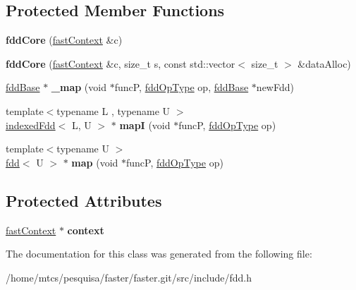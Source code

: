 \subsection*{Protected Member Functions}
\begin{DoxyCompactItemize}
\item 
\hypertarget{classfaster_1_1fddCore_af2bf966f3d75e2d7d0d81f120fb7599a}{}\label{classfaster_1_1fddCore_af2bf966f3d75e2d7d0d81f120fb7599a} 
{\bfseries fdd\+Core} (\hyperlink{classfaster_1_1fastContext}{fast\+Context} \&c)
\item 
\hypertarget{classfaster_1_1fddCore_a437156da84fb4f0e7cb58f2f67ff172b}{}\label{classfaster_1_1fddCore_a437156da84fb4f0e7cb58f2f67ff172b} 
{\bfseries fdd\+Core} (\hyperlink{classfaster_1_1fastContext}{fast\+Context} \&c, size\+\_\+t s, const std\+::vector$<$ size\+\_\+t $>$ \&data\+Alloc)
\item 
\hypertarget{classfaster_1_1fddCore_a1fff34f140b7634b1a6e60b8069a3a29}{}\label{classfaster_1_1fddCore_a1fff34f140b7634b1a6e60b8069a3a29} 
\hyperlink{classfaster_1_1fddBase}{fdd\+Base} $\ast$ {\bfseries \+\_\+map} (void $\ast$funcP, \hyperlink{namespacefaster_a64379512d12d41c6e58f176939abfd80}{fdd\+Op\+Type} op, \hyperlink{classfaster_1_1fddBase}{fdd\+Base} $\ast$new\+Fdd)
\item 
\hypertarget{classfaster_1_1fddCore_a87e8b9e76ef7138a1394265528944ffe}{}\label{classfaster_1_1fddCore_a87e8b9e76ef7138a1394265528944ffe} 
{\footnotesize template$<$typename L , typename U $>$ }\\\hyperlink{classfaster_1_1indexedFdd}{indexed\+Fdd}$<$ L, U $>$ $\ast$ {\bfseries mapI} (void $\ast$funcP, \hyperlink{namespacefaster_a64379512d12d41c6e58f176939abfd80}{fdd\+Op\+Type} op)
\item 
\hypertarget{classfaster_1_1fddCore_a30e174ccee6fc2d00387c85161422825}{}\label{classfaster_1_1fddCore_a30e174ccee6fc2d00387c85161422825} 
{\footnotesize template$<$typename U $>$ }\\\hyperlink{classfaster_1_1fdd}{fdd}$<$ U $>$ $\ast$ {\bfseries map} (void $\ast$funcP, \hyperlink{namespacefaster_a64379512d12d41c6e58f176939abfd80}{fdd\+Op\+Type} op)
\end{DoxyCompactItemize}
\subsection*{Protected Attributes}
\begin{DoxyCompactItemize}
\item 
\hypertarget{classfaster_1_1fddCore_aa2bf63bd5c77afe78061ed4df3713a76}{}\label{classfaster_1_1fddCore_aa2bf63bd5c77afe78061ed4df3713a76} 
\hyperlink{classfaster_1_1fastContext}{fast\+Context} $\ast$ {\bfseries context}
\end{DoxyCompactItemize}


The documentation for this class was generated from the following file\+:\begin{DoxyCompactItemize}
\item 
/home/mtcs/pesquisa/faster/faster.\+git/src/include/fdd.\+h\end{DoxyCompactItemize}
